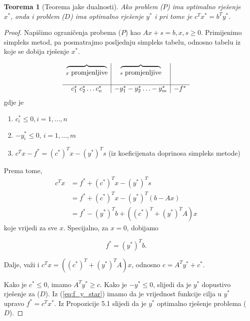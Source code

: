 \documentclass[b5paper, utf8, 11pt, colorlinks]{book}
\newtheorem{thm}{Teorema}[chapter]
\theoremstyle{definition}
\begin{document}
\begin{thm}[Teorema jake dualnosti]
	Ako problem ($P$) ima optimalno rješenje $x^*$, onda i problem ($D$) ima optimalno rješenje $y^*$ i pri tome je $c^T x^* = b^T y^*$.
\end{thm}
\begin{proof}
	Napišimo ograničenja probema ($P$) kao $Ax + s = b, x, s \geq 0$.
	Primijenimo simpleks metod, pa posmatrajmo posljednju  simpleks tabelu, odnosno tabelu iz koje se dobija rješenje $x^*$.
	
	$$\begin{array}{c |c | c}
		\overbrace{\ \ \ \ \ \hspace{1.5cm}}_{x \mbox{ promjenljive}}     &  \overbrace{\ \ \ \ \ \hspace{1.5cm}}_{s \mbox{ promjenljive}} &   \\
		& &   \\
		\hline
		c_1^*\ c_2^* \ldots c_n^*            & -y_1^* -y_2^* \ldots -y_m^*  & -f^*
	\end{array}
	$$
	gdje je 
	\begin{enumerate}
		\item    $c^*_i \leq   0, i = 1,\ldots, n$ 
		\item    $-y_i^* \leq 0$, $i = 1,\ldots, m$
		\item  $c^T x - f^* = (c^*)^T x - (y^*)^T s$ (iz koeficijenata doprinosa simpleks metode)
	\end{enumerate}
	Prema tome, 
	\begin{align*}
		c^T x &=  f^* + (c^*)^T x - (y^*)^T s \\
		&=  f^* + (c^*)^T x - (y^*)^T (b - Ax) \\
		&= f^*  - (y^*)^T b +   ((c^*)^T + (y^*)^T A ) x
	\end{align*}
	koje vrijedi za sve $x$. Specijalno, za  $x = 0$,  dobijamo 
	
	\begin{equation}\label{eq:f_y_star}
		f^* = (y^*)^T b.
	\end{equation}
	
	Dalje, važi i $c^T x = ((c^*)^T + (y^*)^T A ) x$, odnosno     $ c = A^T y^* + c^*$. 
	
	Kako je $c^* \leq 0$, imamo  $A^T y^* \geq c$. Kako je $-y^* \leq 0$, slijedi da je $y^*$ dopustivo rješenje za  ($D$).  Iz (\ref{eq:f_y_star}) imamo da je vrijednost funkcije cilja u $y^*$ upravo $f^* = c^T x^* $. Iz Propozicije 5.1  slijedi da je $y^*$ optimalno rješenje problema  ($D$). 
	
	
\end{proof} 
\end{document}
